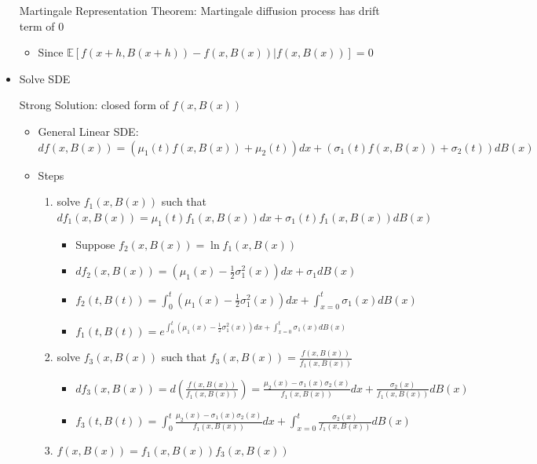 \documentclass[a4paper]{article}
\begin{document}
\begin{itemize}
        Martingale Representation Theorem: Martingale diffusion process has drift term of 0
        \begin{itemize}
            \item Since $\mathbb{E}[f(x+h, B(x+h)) - f(x, B(x))| f(x, B(x))] = 0$
        \end{itemize}
    \item Solve SDE

        Strong Solution: closed form of $f(x, B(x))$
        \begin{itemize}
            \item General Linear SDE: $d f(x, B(x)) = (\mu_1(t) f(x, B(x)) + \mu_2(t))dx + (\sigma_1(t) f(x, B(x)) + \sigma_2(t)) d B(x)$
            \item Steps
                \begin{enumerate}
                    \item solve $f_1(x, B(x))$ such that $d f_1(x, B(x)) = \mu_1(t) f_1(x, B(x)) dx + \sigma_1(t) f_1(x, B(x)) d B(x)$
                        \begin{itemize}
                            \item Suppose $f_2(x, B(x)) = \ln f_1(x, B(x))$
                            \item $d f_2(x, B(x)) = (\mu_1(x) - \frac{1}{2}\sigma_1^2(x)) dx + \sigma_1 d B(x)$
                            \item $f_2(t, B(t)) = \int_0^t (\mu_1(x) - \frac{1}{2}\sigma_1^2(x)) dx + \int_{x=0}^t \sigma_1(x) d B(x)$
                            \item $f_1(t, B(t)) = e^{\int_0^t (\mu_1(x) - \frac{1}{2}\sigma_1^2(x)) dx + \int_{x=0}^t \sigma_1(x) d B(x)}$
                        \end{itemize}
                    \item solve $f_3(x, B(x))$ such that $f_3(x, B(x)) = \frac{f(x, B(x))}{f_1(x, B(x))}$
                        \begin{itemize}
                            \item $d f_3(x, B(x)) = d(\frac{f(x, B(x))}{f_1(x, B(x))}) = \frac{\mu_2(x) - \sigma_1(x) \sigma_2(x)}{f_1(x, B(x))} dx + \frac{\sigma_2(x)}{f_1(x, B(x))} d B(x)$
                            \item $f_3(t, B(t)) = \int_0^t \frac{\mu_2(x) - \sigma_1(x) \sigma_2(x)}{f_1(x, B(x))} dx + \int_{x=0}^t \frac{\sigma_2(x)}{f_1(x, B(x))} d B(x)$
                        \end{itemize}
                    \item $f(x, B(x)) = f_1(x, B(x)) f_3(x, B(x))$

\end{enumerate}
\end{itemize}
\end{itemize}
\end{document}
